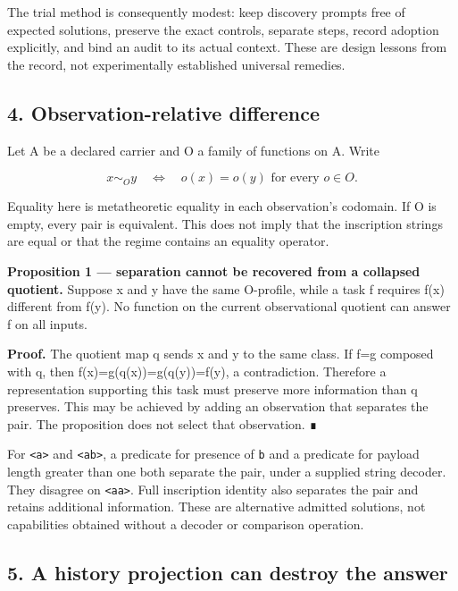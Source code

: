 \documentclass[
  11pt,
]{article}
\begin{document}
The trial method is consequently modest: keep discovery prompts free of
expected solutions, preserve the exact controls, separate steps, record
adoption explicitly, and bind an audit to its actual context. These are
design lessons from the record, not experimentally established universal
remedies.

\subsection{4. Observation-relative
difference}\label{observation-relative-difference}

Let A be a declared carrier and O a family of functions on A. Write

\[
x\sim_O y \quad\Longleftrightarrow\quad
   o(x)=o(y)\text{ for every }o\in O.
\]

Equality here is metatheoretic equality in each observation's codomain.
If O is empty, every pair is equivalent. This does not imply that the
inscription strings are equal or that the regime contains an equality
operator.

\textbf{Proposition 1 --- separation cannot be recovered from a
collapsed quotient.} Suppose x and y have the same O-profile, while a
task f requires f(x) different from f(y). No function on the current
observational quotient can answer f on all inputs.

\textbf{Proof.} The quotient map q sends x and y to the same class. If
f=g composed with q, then f(x)=g(q(x))=g(q(y))=f(y), a contradiction.
Therefore a representation supporting this task must preserve more
information than q preserves. This may be achieved by adding an
observation that separates the pair. The proposition does not select
that observation. ∎

For \texttt{\textless{}a\textgreater{}} and
\texttt{\textless{}ab\textgreater{}}, a predicate for presence of
\nolinkurl{b} and a predicate for payload length greater than one both
separate the pair, under a supplied string decoder. They disagree on
\texttt{\textless{}aa\textgreater{}}. Full inscription identity also
separates the pair and retains additional information. These are
alternative admitted solutions, not capabilities obtained without a
decoder or comparison operation.

\subsection{5. A history projection can destroy the
answer}\label{a-history-projection-can-destroy-the-answer}
\end{document}

